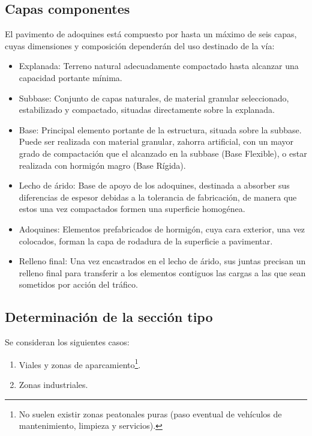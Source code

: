 \subsection{Capas componentes}

El pavimento de adoquines está compuesto por hasta un máximo de seis capas, cuyas dimensiones y composición dependerán del uso destinado de la vía:

\begin{itemize}
\item Explanada: Terreno natural adecuadamente compactado hasta alcanzar una capacidad portante mínima.
\item Subbase: Conjunto de capas naturales, de material granular seleccionado, estabilizado y compactado, situadas directamente sobre la explanada.
\item Base: Principal elemento portante de la estructura, situada sobre la subbase. Puede ser realizada con material granular, zahorra artificial, con un mayor grado de compactación que el alcanzado en la subbase (Base Flexible), o estar realizada con hormigón magro (Base Rígida).
\item Lecho de árido: Base de apoyo de los adoquines, destinada a absorber sus diferencias de espesor debidas a la tolerancia de fabricación, de manera que estos una vez compactados formen una superficie homogénea.
\item Adoquines: Elementos prefabricados de hormigón, cuya cara exterior, una vez colocados, forman la capa de rodadura de la superficie a pavimentar.
\item Relleno final: Una vez encastrados en el lecho de árido, sus juntas precisan un relleno final para transferir a los elementos contiguos las cargas a las que sean sometidos por acción del tráfico.
\end{itemize}

\subsection{Determinación de la sección tipo}\label{sec:secciontipo}

Se consideran los siguientes casos:

\begin{enumerate}
\item Viales y zonas de aparcamiento\footnote{No suelen existir zonas peatonales puras (paso eventual de vehículos de mantenimiento, limpieza y servicios).}.
\item Zonas industriales.
\end{enumerate}

